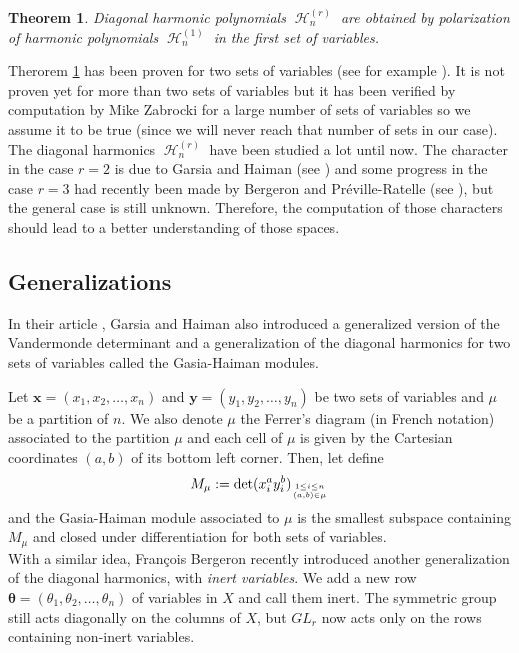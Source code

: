 \documentclass[letter,12pt]{article}
\DeclareMathOperator{\harmonics}{\mathcal{H}}
\newtheorem{theorem}{Theorem}
\begin{document}
	\begin{theorem} \label{DiagHarm}
		Diagonal harmonic polynomials $\harmonics_n^{(r)}$ are obtained by polarization of harmonic polynomials $\harmonics_n^{(1)}$ in the first set of variables.
	\end{theorem}
	
	Therorem \ref{DiagHarm} has been proven for two sets of variables (see for example \cite{Bergeron2009}). It is not proven yet for more than two sets of variables but it has been verified by computation by Mike Zabrocki for a large number of sets of variables so we assume it to be true (since we will never reach that number of sets in our case).  \\
	
	The diagonal harmonics $\harmonics_n^{(r)}$ have been studied a lot until now. The character in the case $r=2$ is due to Garsia and Haiman (see \cite{GarsiaHaiman1993}) and some progress in the case $r=3$ had recently been made by Bergeron and Préville-Ratelle (see \cite{BergeronPreville2012}), but the general case is still unknown. Therefore, the computation of those characters should lead to a better understanding of those spaces. 
	
	\subsection{Generalizations}
	
	In their article \cite{GarsiaHaiman1993}, Garsia and Haiman also introduced a generalized version of the Vandermonde determinant and a generalization of the diagonal harmonics for two sets of variables called the Gasia-Haiman modules. 
	
	Let $\bm{x}=(x_1, x_2, \dots, x_n)$ and $\bm{y}=(y_1, y_2, \dots, y_n)$ be two sets of variables and $\mu$ be a partition of $n$. We also denote $\mu$ the Ferrer's diagram (in French notation) associated to the partition $\mu$ and each cell of $\mu$ is given by the Cartesian coordinates $(a,b)$ of its bottom left corner. Then, let define
	$$M_{\mu} := \det (x_i^ ay_i^ b)_{1 \leq i \leq n \atop (a,b) \in \mu}$$
	and the Gasia-Haiman module associated to $\mu$ is the smallest subspace containing $M_{\mu}$ and closed under differentiation for both sets of variables. \\
	
	With a similar idea, François Bergeron recently introduced another generalization of the diagonal harmonics, with \emph{inert variables}. We add a new row $\bm{\theta} = (\theta_1, \theta_2, \dots, \theta_n)$ of variables in $X$ and call them inert. The symmetric group still acts diagonally on the columns of $X$, but $GL_r$ now acts only on the rows containing non-inert variables. 
		 
\end{document}
